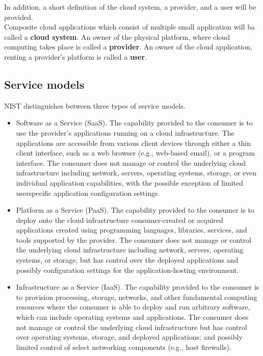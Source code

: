 In addition, a short definition of the cloud system, a provider, and a user will be provided.\\
Composite cloud applications which consist of multiple small application will ba called a \textbf{cloud system}\label{def:csys}. %
An owner of the physical platform, where cloud computing takes place is called a \textbf{provider}.
An owner of the cloud application, renting a provider's platform is called a \textbf{user}.
\subsection*{Service models}\label{def:servmod}
NIST distinguishes between three types of service models.
\begin{itemize}
	\item Software as a Service (SaaS). 
	The capability provided to the consumer is to use the provider’s applications running on a cloud infrastructure. 
	The applications are accessible from various client devices through either a thin client interface, such as a web browser (e.g., web-based email), or a program interface. 
	The consumer does not manage or control the underlying cloud infrastructure including network, servers, operating systems, storage, or even individual application capabilities, with the possible exception of limited userspecific application configuration settings.
	\item Platform as a Service (PaaS). 
	The capability provided to the consumer is to deploy onto the cloud infrastructure consumer-created or acquired applications created using programming languages, libraries, services, and tools supported by the provider.
	The consumer does not manage or control the underlying cloud infrastructure including network, servers, operating systems, or storage, but has control over the deployed applications and possibly configuration settings for the application-hosting environment.
	\item Infrastructure as a Service (IaaS).
	The capability provided to the consumer is to provision processing, storage, networks, and other fundamental computing resources where the
	consumer is able to deploy and run arbitrary software, which can include operating systems and applications.
	The consumer does not manage or control the underlying cloud infrastructure but has control over operating systems, storage, and deployed applications; and possibly limited control of select networking components (e.g., host firewalls).
\end{itemize}

